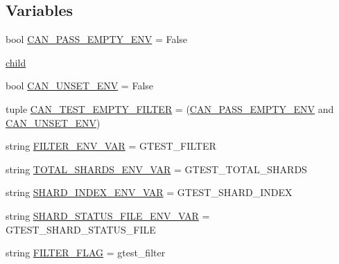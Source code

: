\subsection*{Variables}
\begin{DoxyCompactItemize}
\item 
bool \mbox{\hyperlink{namespacegoogletest-filter-unittest_ad4dd127fd724efb14ebe07685502b1bc}{C\+A\+N\+\_\+\+P\+A\+S\+S\+\_\+\+E\+M\+P\+T\+Y\+\_\+\+E\+NV}} = False
\item 
\mbox{\hyperlink{namespacegoogletest-filter-unittest_a9eaaae3d0fe9a68dca2437c6866973e9}{child}}
\item 
bool \mbox{\hyperlink{namespacegoogletest-filter-unittest_a12d2eb0489390acb505e766b80fa3ed3}{C\+A\+N\+\_\+\+U\+N\+S\+E\+T\+\_\+\+E\+NV}} = False
\item 
tuple \mbox{\hyperlink{namespacegoogletest-filter-unittest_a6ceb9364ef75b2c00a185e27de236af3}{C\+A\+N\+\_\+\+T\+E\+S\+T\+\_\+\+E\+M\+P\+T\+Y\+\_\+\+F\+I\+L\+T\+ER}} = (\mbox{\hyperlink{namespacegoogletest-filter-unittest_ad4dd127fd724efb14ebe07685502b1bc}{C\+A\+N\+\_\+\+P\+A\+S\+S\+\_\+\+E\+M\+P\+T\+Y\+\_\+\+E\+NV}} and \mbox{\hyperlink{namespacegoogletest-filter-unittest_a12d2eb0489390acb505e766b80fa3ed3}{C\+A\+N\+\_\+\+U\+N\+S\+E\+T\+\_\+\+E\+NV}})
\item 
string \mbox{\hyperlink{namespacegoogletest-filter-unittest_a46498d9c10f33d630f16a77666c5faf7}{F\+I\+L\+T\+E\+R\+\_\+\+E\+N\+V\+\_\+\+V\+AR}} = \textquotesingle{}G\+T\+E\+S\+T\+\_\+\+F\+I\+L\+T\+ER\textquotesingle{}
\item 
string \mbox{\hyperlink{namespacegoogletest-filter-unittest_ab5b5d00d328eeb72a3b1a8612c700c5c}{T\+O\+T\+A\+L\+\_\+\+S\+H\+A\+R\+D\+S\+\_\+\+E\+N\+V\+\_\+\+V\+AR}} = \textquotesingle{}G\+T\+E\+S\+T\+\_\+\+T\+O\+T\+A\+L\+\_\+\+S\+H\+A\+R\+DS\textquotesingle{}
\item 
string \mbox{\hyperlink{namespacegoogletest-filter-unittest_a1843aa3828bc65cef41d1978f4a1b650}{S\+H\+A\+R\+D\+\_\+\+I\+N\+D\+E\+X\+\_\+\+E\+N\+V\+\_\+\+V\+AR}} = \textquotesingle{}G\+T\+E\+S\+T\+\_\+\+S\+H\+A\+R\+D\+\_\+\+I\+N\+D\+EX\textquotesingle{}
\item 
string \mbox{\hyperlink{namespacegoogletest-filter-unittest_a9855050e7626b36620408737b7f8d56c}{S\+H\+A\+R\+D\+\_\+\+S\+T\+A\+T\+U\+S\+\_\+\+F\+I\+L\+E\+\_\+\+E\+N\+V\+\_\+\+V\+AR}} = \textquotesingle{}G\+T\+E\+S\+T\+\_\+\+S\+H\+A\+R\+D\+\_\+\+S\+T\+A\+T\+U\+S\+\_\+\+F\+I\+LE\textquotesingle{}
\item 
string \mbox{\hyperlink{namespacegoogletest-filter-unittest_ac1f80cdfddece685ad526019b12fe2e3}{F\+I\+L\+T\+E\+R\+\_\+\+F\+L\+AG}} = \textquotesingle{}gtest\+\_\+filter\textquotesingle{}

\end{DoxyCompactItemize}
